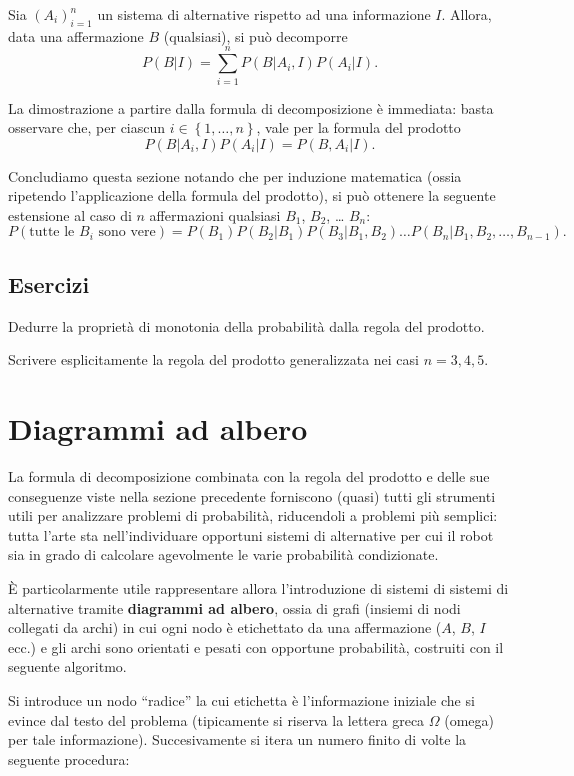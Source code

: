 \documentclass[
  italian,
  letterpaper,
]{book}
\newcommand{\cur}[1]{\left\{ #1 \right\}}
\theoremstyle{definition}
\theoremstyle{remark}
\begin{document}
Sia \((A_i)_{i=1}^n\) un sistema di alternative rispetto ad una
informazione \(I\). Allora, data una affermazione \(B\) (qualsiasi), si
può decomporre \[ P(B|I) =  \sum_{i=1}^n P(B | A_i, I) P(A_i | I). \]

La dimostrazione a partire dalla formula di decomposizione è immediata:
basta osservare che, per ciascun \(i \in \cur{1, \ldots, n}\), vale per
la formula del prodotto \[ P(B | A_i, I) P(A_i | I)  = P(B, A_i | I). \]

Concludiamo questa sezione notando che per induzione matematica (ossia
ripetendo l'applicazione della formula del prodotto), si può ottenere la
seguente estensione al caso di \(n\) affermazioni qualsiasi \(B_1\),
\(B_2\), \ldots{} \(B_n\):
\[ P( \text{tutte le $B_i$ sono vere}) = P(B_1) P(B_2|B_1) P(B_3| B_1, B_2) \ldots P(B_n |B_1,B_2, \ldots, B_{n-1}).\]

\subsection{Esercizi}\label{esercizi-3}

Dedurre la proprietà di monotonia della probabilità dalla regola del
prodotto.

Scrivere esplicitamente la regola del prodotto generalizzata nei casi
\(n=3, 4, 5\).

\section{Diagrammi ad albero}\label{sec-alberi}

La formula di decomposizione combinata con la regola del prodotto e
delle sue conseguenze viste nella sezione precedente forniscono (quasi)
tutti gli strumenti utili per analizzare problemi di probabilità,
riducendoli a problemi più semplici: tutta l'arte sta nell'individuare
opportuni sistemi di alternative per cui il robot sia in grado di
calcolare agevolmente le varie probabilità condizionate.

È particolarmente utile rappresentare allora l'introduzione di sistemi
di sistemi di alternative tramite \textbf{diagrammi ad albero}, ossia di
grafi (insiemi di nodi collegati da archi) in cui ogni nodo è
etichettato da una affermazione (\(A\), \(B\), \(I\) ecc.) e gli archi
sono orientati e pesati con opportune probabilità, costruiti con il
seguente algoritmo.

Si introduce un nodo ``radice'' la cui etichetta è l'informazione
iniziale che si evince dal testo del problema (tipicamente si riserva la
lettera greca \(\Omega\) (omega) per tale informazione). Succesivamente
si itera un numero finito di volte la seguente procedura:
\end{document}
